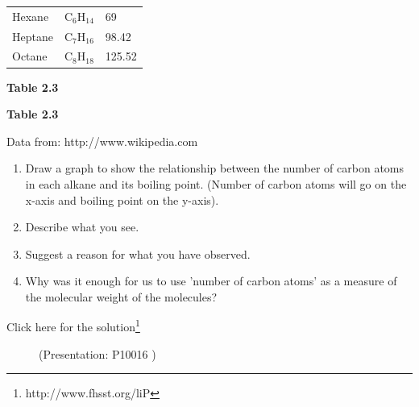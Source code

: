 \begin{table}[H]
\begin{center}
\begin{xtabular}[t]{|l|l|l|}
        Hexane &
        ${\mathrm{C}}_{6}{\mathrm{H}}_{14}$ &
        69%
     \tabularnewline{}
        Heptane &
        ${\mathrm{C}}_{7}{\mathrm{H}}_{16}$ &
        98.42%
     \tabularnewline{}
        Octane &
        ${\mathrm{C}}_{8}{\mathrm{H}}_{18}$ &
        125.52%
     \tabularnewline{}
    \end{xtabular}
      \end{center}
    \begin{center}{\small\bfseries Table 2.3}\end{center}
    \begin{caption}{\small\bfseries Table 2.3}\end{caption}
\end{table}
    \par
  Data from: http://www.wikipedia.com\label{m38734*id310184}\begin{enumerate}[noitemsep, label=\textbf{\arabic*}. ] 
            \label{m38734*uid46}\item Draw a 
graph to show the relationship between the number of carbon atoms in each 
alkane and its boiling point. (Number of carbon atoms will go on the x-axis and 
boiling point on the y-axis).
\label{m38734*uid47}\item Describe what you see.
\label{m38734*uid48}\item Suggest a reason for what you have observed.
\label{m38734*uid49}\item Why was it enough for us to use 'number of carbon atoms' 
as a measure of the molecular weight of the molecules?
\end{enumerate}
        Click 
here for the solution\footnote{http://www.fhsst.org/liP}
        \par 
\label{m38734*eip-661}
    \setcounter{subfigure}{0}
	\begin{figure}[H] %
    \label{m38734*slidesharemedia1}\label{m38734*slideshareflash1}
             { (Presentation:  P10016 )}
      \vspace{2pt}
    \vspace{.1in}
 \end{figure}       \par 
\label{m38734**end}
